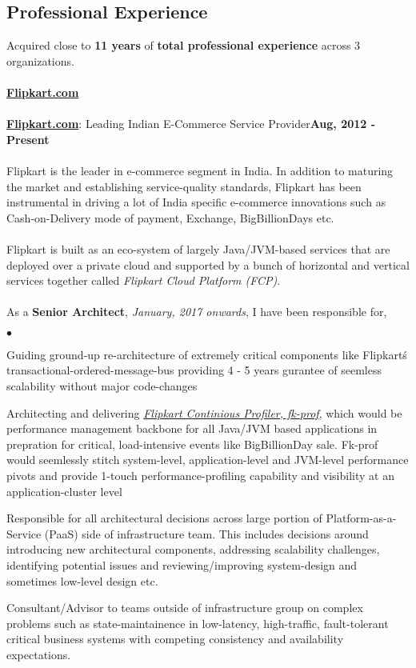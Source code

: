 \documentclass[margin,line]{res}
\newenvironment{list2}{
  \begin{list}{$\bullet$}{%
      \setlength{\itemsep}{0in}
      \setlength{\parsep}{0in} \setlength{\parskip}{0in}
      \setlength{\topsep}{0in} \setlength{\partopsep}{0in} 
      \setlength{\leftmargin}{0.2in}}}{\end{list}}
\begin{document}
\begin{resume}
\section{\sc Professional Experience}
\vspace{.4cm}
Acquired close to {\bf 11 years} of {\bf total professional experience} across 3 organizations.\\
\\
{\underline {\bf Flipkart.com}}\\
\\
\href{https://www.flipkart.com/}{\bf Flipkart.com}: Leading Indian E-Commerce Service Provider\hfill {\bf Aug, 2012 - Present}\\
\vspace{-.2cm}\\
Flipkart is the leader in e-commerce segment in India. In addition to maturing the market and establishing service-quality standards, Flipkart has been instrumental in driving a lot of India specific e-commerce innovations such as Cash-on-Delivery mode of payment, Exchange, BigBillionDays etc.\\
\\
Flipkart is built as an eco-system of largely Java/JVM-based services that are deployed over a private cloud and supported by a bunch of horizontal and vertical services together called {\em Flipkart Cloud Platform (FCP)}.\\
\\
As a {\bf Senior Architect}, {\em January, 2017 onwards}, I have been responsible for,\\
\begin{list2}
\item Guiding ground-up re-architecture of extremely critical components like Flipkart\'s transactional-ordered-message-bus providing 4 - 5 years gurantee of seemless scalability without major code-changes
\item Architecting and delivering \href{https://github.com/Flipkart/fk-prof}{\em Flipkart Continious Profiler, fk-prof}, which would be performance management backbone for all Java/JVM based applications in prepration for critical, load-intensive events like BigBillionDay sale. Fk-prof would seemlessly stitch system-level, application-level and JVM-level performance pivots and provide 1-touch performance-profiling capability and visibility at an application-cluster level
\item Responsible for all architectural decisions across large portion of Platform-as-a-Service (PaaS) side of infrastructure team. This includes decisions around introducing new architectural components, addressing scalability challenges, identifying potential issues and reviewing/improving system-design and sometimes low-level design etc.
\item Consultant/Advisor to teams outside of infrastructure group on complex problems such as state-maintainence in low-latency, high-traffic, fault-tolerant critical business systems with competing consistency and availability expectations.
\end{list2}


\end{resume}
\end{document}
